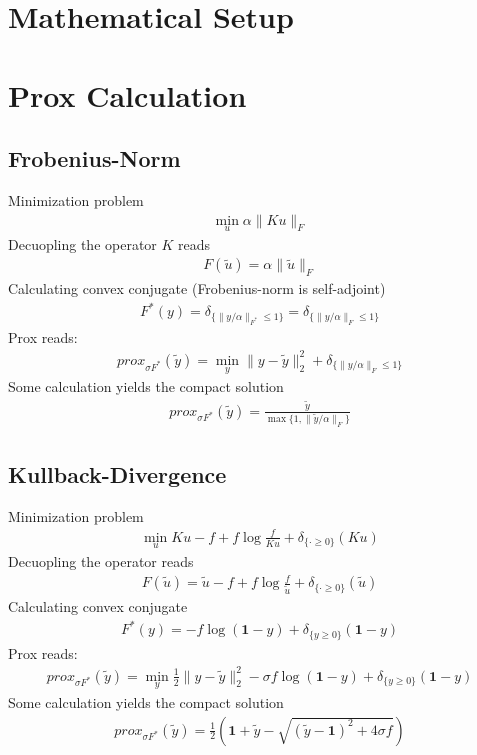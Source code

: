 \documentclass[final,leqno,onefignum,onetabnum]{article}
\newcommand{\1}[1]{\mathds{1}_{#1}}
\begin{document}
\begin{appendix}
\section{Mathematical Setup}	
	
\section{Prox Calculation}

\subsection{Frobenius-Norm}
Minimization problem
\begin{align}
	\min_u \alpha\|Ku\|_F	
\end{align}
Decuopling the operator $K$ reads
\begin{align}
	F(\tilde{u}) = \alpha\|\tilde{u}\|_F
\end{align}
Calculating convex conjugate (Frobenius-norm is self-adjoint)
\begin{align}
	F^*(y) = \delta_{\{ \|y/\alpha\|_{F^*} \leq 1 \}} = \delta_{\{ \|y/\alpha\|_{F} \leq 1 \}}
\end{align}
Prox reads:
\begin{align}
	prox_{\sigma F^*}(\tilde{y}) = \min_y \|y-\tilde{y}\|_2^2 + \delta_{\{ \|y/\alpha\|_{F} \leq 1 \}}	
\end{align}
Some calculation yields the compact solution
\begin{align}
	prox_{\sigma F^*}(\tilde{y}) = \frac{\tilde{y}}{\max\{1, \|\tilde{y}/\alpha\|_{F} \}}
\end{align}


\subsection{Kullback-Divergence}
Minimization problem
\begin{align}
\min_u Ku-f+f\log\frac{f}{Ku} + \delta_{\{ \cdot\geq 0 \}}(Ku)	
\end{align}
Decuopling the operator reads
\begin{align}
	F(\tilde{u}) = \tilde{u}-f+f\log\frac{f}{\tilde{u}} + \delta_{\{ \cdot\geq 0 \}}(\tilde{u})	
\end{align}
Calculating convex conjugate
\begin{align}
F^*(y) = -f\log(\boldsymbol{1}-y) + \delta_{\{ y\geq 0 \}}(\boldsymbol{1}-y)	
\end{align}
Prox reads:
\begin{align}
prox_{\sigma F^*}(\tilde{y}) = \min_y \frac{1}{2}\|y-\tilde{y}\|_2^2 -\sigma f\log(\boldsymbol{1}-y) + \delta_{\{ y\geq 0 \}}(\boldsymbol{1}-y)
\end{align}
Some calculation yields the compact solution
\begin{align}
prox_{\sigma F^*}(\tilde{y}) = \frac{1}{2}\left( \boldsymbol{1} + \tilde{y} - \sqrt{ (\tilde{y}-\boldsymbol{1})^2 + 4\sigma f }\right) 
\end{align}


\end{appendix}
\end{document}
